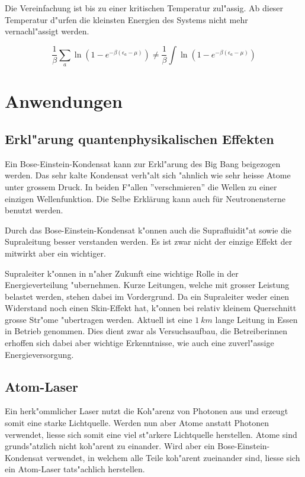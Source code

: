 \begin{refsection}
Die Vereinfachung ist bis zu einer kritischen Temperatur zul"assig. Ab dieser Temperatur d"urfen die kleinsten Energien des Systems nicht mehr vernachl"assigt werden.

\begin{equation}
\frac{1}{\beta} \sum_{a} \ln(1-e^{-\beta (\epsilon_a-\mu)}) \neq \frac{1}{\beta} \int \ln(1-e^{-\beta (\epsilon_a-\mu)})
\end{equation}

\section{Anwendungen}
\subsection{Erkl"arung quantenphysikalischen Effekten}
Ein Bose-Einstein-Kondensat kann zur Erkl"arung des Big Bang beigezogen werden. Das sehr kalte Kondensat verh"alt sich "ahnlich wie sehr heisse Atome unter grossem Druck. In beiden F"allen ''verschmieren'' die Wellen zu einer einzigen Wellenfunktion. Die Selbe Erklärung kann auch für Neutronensterne benutzt werden. \cite{bose:MITvideo}

Durch das Bose-Einstein-Kondensat k"onnen auch die Suprafluidit"at sowie die Supraleitung besser verstanden werden. Es ist zwar nicht der einzige Effekt der mitwirkt aber ein wichtiger. 

Supraleiter k"onnen in n"aher Zukunft eine wichtige Rolle in der Energieverteilung "ubernehmen. Kurze Leitungen, welche mit grosser Leistung belastet werden, stehen dabei im Vordergrund. Da ein Supraleiter weder einen Widerstand noch einen Skin-Effekt hat, k"onnen bei relativ kleinem Querschnitt grosse Str"ome "ubertragen werden. 
Aktuell ist eine $1~km$ lange Leitung in Essen in Betrieb genommen. Dies dient zwar als Versuchsaufbau, die Betreiberinnen erhoffen sich dabei aber wichtige Erkenntnisse, wie auch eine zuverl"assige Energieversorgung. \cite{bose:SupraVerteilnetze}

\subsection{Atom-Laser}
Ein herk"ommlicher Laser nutzt die Koh"arenz von Photonen aus und erzeugt somit eine starke Lichtquelle. Werden nun aber Atome anstatt Photonen verwendet, liesse sich somit eine viel st"arkere Lichtquelle herstellen. Atome sind grunds"atzlich nicht koh"arent zu einander. Wird aber ein Bose-Einstein-Kondensat verwendet, in welchem alle Teile koh"arent zueinander sind, liesse sich ein Atom-Laser tats"achlich herstellen.


\end{refsection}
